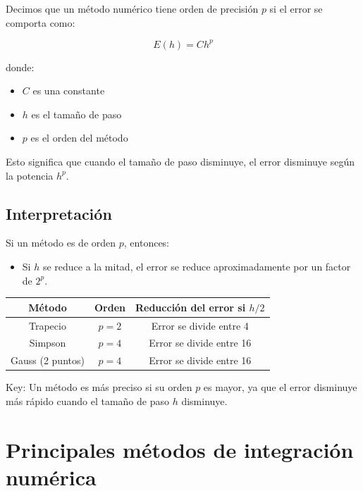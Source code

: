 \documentclass[12pt,a4paper]{article}
\begin{document}
Decimos que un método numérico tiene orden de precisión $p$ si el error se comporta como:

\[
E(h) = C h^p
\]

donde:
\begin{itemize}
\item $C$ es una constante
\item $h$ es el tamaño de paso
\item $p$ es el orden del método
\end{itemize}

Esto significa que cuando el tamaño de paso disminuye, el error disminuye según la potencia $h^p$.

\subsection{Interpretación}

Si un método es de orden $p$, entonces:

\begin{itemize}
\item Si $h$ se reduce a la mitad, el error se reduce aproximadamente por un factor de $2^p$.
\end{itemize}

\begin{center}
\begin{tabular}{ccc}
\toprule
Método & Orden & Reducción del error si $h/2$ \\
\midrule
Trapecio & $p=2$ & Error se divide entre 4 \\
Simpson & $p=4$ & Error se divide entre 16 \\
Gauss (2 puntos) & $p=4$ & Error se divide entre 16 \\
\bottomrule
\end{tabular}
\end{center}


Key: Un método es más preciso si su orden $p$ es mayor, ya que el error disminuye más rápido
cuando el tamaño de paso $h$ disminuye.

\newpage
\section{Principales métodos de integración numérica}
\end{document}
